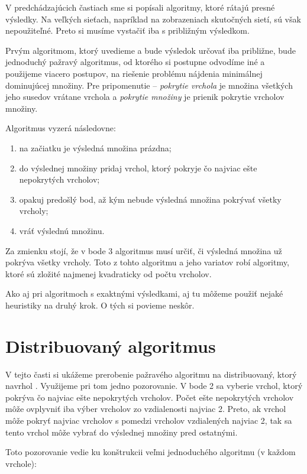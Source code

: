V predchádzajúcich častiach sme si popísali algoritmy, ktoré rátajú presné 
výsledky. Na veľkých sieťach, napríklad na zobrazeniach skutočných sietí, 
sú však nepoužiteľné. Preto si musíme vystačiť iba s približným výsledkom. 

Prvým algoritmom, ktorý uvedieme a bude výsledok určovať iba približne, bude 
jednoduchý pažravý algoritmus, od ktorého si postupne odvodíme iné a použijeme 
viacero postupov, na riešenie problému nájdenia minimálnej dominujúcej množiny. 
Pre pripomenutie -- \emph{pokrytie vrchola} je množina všetkých jeho susedov 
vrátane vrchola a \emph{pokrytie množiny} je prienik pokrytie vrcholov množiny. 

Algoritmus vyzerá následovne:
\begin{enumerate}
	\item na začiatku je výsledná množina prázdna;
	\item do výslednej množiny pridaj vrchol, ktorý pokryje čo najviac ešte 
		nepokrytých vrcholov;
	\item opakuj predošlý bod, až kým nebude výsledná množina pokrývať všetky 
		vrcholy;
	\item vráť výslednú množinu.
\end{enumerate}

Za zmienku stojí, že v bode 3 algoritmus musí určiť, či výsledná množina už 
pokrýva všetky vrcholy. Toto z tohto algoritmu a jeho variatov robí algoritmy, 
ktoré sú zložité najmenej kvadraticky od počtu vrcholov.

Ako aj pri algoritmoch s exaktnými výsledkami, aj tu môžeme použiť nejaké 
heuristiky na druhý krok. O tých si povieme neskôr.

\section{Distribuovaný algoritmus}\label{sec:dist}

V tejto časti si ukážeme prerobenie pažravého algoritmu na distribuovaný, ktorý 
navrhol \citet{chapS}. 
Využijeme pri tom jedno pozorovanie. V bode 2 sa vyberie vrchol, ktorý pokrýva 
čo najviac ešte nepokrytých vrcholov. Počet ešte nepokrytých vrcholov môže 
ovplyvniť iba výber vrcholov zo vzdialenosti najviac 2. Preto, ak vrchol môže 
pokryť najviac vrcholov s pomedzi vrcholov vzdialených najviac 2, tak sa tento 
vrchol môže vybrať do výslednej množiny pred ostatnými. 

Toto pozorovanie vedie ku konštrukcii veľmi jednoduchého algoritmu (v každom 
vrchole):

